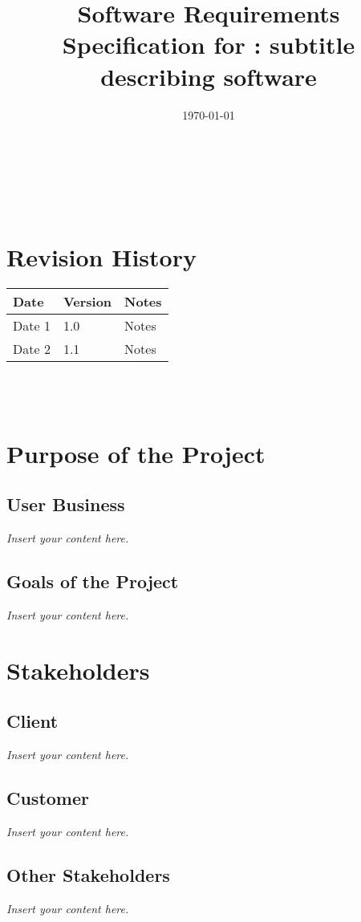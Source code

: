 \documentclass[12pt]{article}
\newcommand{\lips}{\textit{Insert your content here.}}
\begin{document}
\title{Software Requirements Specification for \progname: subtitle describing software} 
\author{\authname}
\date{\today}
	
\maketitle

~\newpage


\tableofcontents

~\newpage

\section*{Revision History}

\begin{tabularx}{\textwidth}{p{3cm}p{2cm}X}
\toprule {\textbf{Date}} & {\textbf{Version}} & {\textbf{Notes}}\\
\midrule
Date 1 & 1.0 & Notes\\
Date 2 & 1.1 & Notes\\
\bottomrule
\end{tabularx}

~\\

~\newpage
\section{Purpose of the Project}
\subsection{User Business}
\lips
\subsection{Goals of the Project}
\lips
\section{Stakeholders}
\subsection{Client}
\lips
\subsection{Customer}
\lips
\subsection{Other Stakeholders}
\lips
\end{document}
